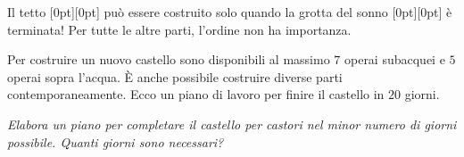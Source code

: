 {\begin{adjustwidth}{1.5em}{0em}
\end{adjustwidth}

Il tetto \raisebox{-0.5ex}[0pt][0pt]{} può essere costruito solo quando la grotta del sonno \raisebox{-0.5ex}[0pt][0pt]{} è terminata! Per tutte le altre parti, l’ordine non ha importanza.

Per costruire un nuovo castello sono disponibili al massimo $7$ operai subacquei e $5$ operai sopra l’acqua.
È anche possibile costruire diverse parti contemporaneamente.
Ecco un piano di lavoro per finire il castello in $20$ giorni.

{\centering%
\par}



{\em
Elabora un piano per completare il castello per castori nel minor numero di giorni possibile.
Quanti giorni sono necessari?


}





}
